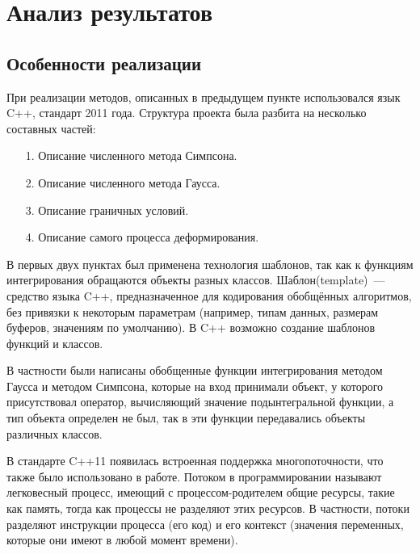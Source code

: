 \chapter{Анализ результатов\label{chapter_2}}
\section{Особенности реализации}

При реализации методов, описанных в предыдущем пункте использовался язык C++, стандарт 2011 года.
Структура проекта была разбита на несколько составных частей:
\begin{itemize}
\item[1.] Описание численного метода Симпсона.
\item[2.] Описание численного метода Гаусса.
\item[3.] Описание граничных условий.
\item[4.] Описание самого процесса деформирования.
\end{itemize}

В первых двух пунктах был применена технология шаблонов, так как к функциям интегрирования обращаются объекты разных классов.
Шаблон(template)~--- средство языка C++, предназначенное для кодирования обобщённых алгоритмов, без привязки к некоторым параметрам (например, типам данных, размерам буферов, значениям по умолчанию). В C++ возможно создание шаблонов функций и классов.

В частности были написаны обобщенные функции интегрирования методом Гаусса и методом Симпсона, которые на вход принимали объект, у которого присутствовал оператор, вычисляющий значение подынтегральной функции, а тип объекта определен не был, так в эти функции передавались объекты различных классов. 

В стандарте C++11 появилась встроенная поддержка многопоточности, что также было использовано в работе.
Потоком в программировании называют легковесный процесс, имеющий с процессом-родителем общие ресурсы, такие как память, тогда как процессы не разделяют этих ресурсов. В частности, потоки разделяют инструкции процесса (его код) и его контекст (значения переменных, которые они имеют в любой момент времени).

